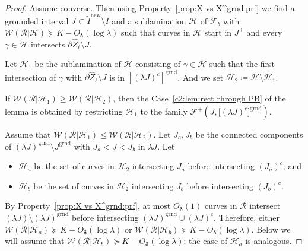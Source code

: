 \documentclass{amsart}
\newcommand{\1}{{\mathbb 1 }}
\newcommand{\FamH}{{\mathcal H}}
\newcommand{\Fam}{{\mathcal F}}
\newcommand{\Width}{{\mathcal W}}
\newcommand\RR{\mathcal{R}}
\newcommand{\wZ}{{\widehat Z}}
\newcommand{\grnd}{{\operatorname{grnd}}}
\newcommand\new{{\operatorname{new}}}
\theoremstyle{remark}
\numberwithin{equation}{section}
\theoremstyle{definition}
\newcommand{\bdelta}{{\boldsymbol{ \delta}}}
\begin{document}
\begin{proof}
Assume converse. Then using Property~\ref{prop:X vs X^grnd:prf} we find a grounded interval $J\subset \widetilde I^\new\setminus I$  and a sublamination $\FamH$ of $\Fam_b$ with $\Width(\RR|\FamH)\succeq K-O_\bdelta(\log \lambda)$ such that curves in $\FamH$ start in $J^+$ and every $\gamma\in \FamH$ intersects $\partial \wZ_\ell\setminus J$. 

Let $\FamH_1$ be the sublamination of $\FamH$ consisting of $\gamma\in \FamH$ such that the first intersection of $\gamma$ with $\partial \wZ_\ell\setminus J$ is in $\left[(\lambda J)^c\right]^\grnd$. And we set $\FamH_2\coloneqq \FamH\setminus \FamH_1$.

If $\Width(\RR|\FamH_1)\ge \Width(\RR|\FamH_2)$, then the Case~\ref{c2:lem:rect rhrough PB} of the lemma is obtained by restricting $\FamH_1$ to the family $\Fam^+\left(J, \big[(\lambda J)^c \big]^\grnd\right)$.


Assume that $\Width(\RR|\FamH_1)\le \Width(\RR|\FamH_2)$. Let $J_a,J_b$ be the connected components of $(\lambda J)^\grnd\setminus J^\grnd$ with $J_a<J<J_b$ in $\lambda J$. Let 
\begin{itemize}
\item $\FamH_a$ be the set of curves in $\FamH_2$ intersecting $J_a$ before intersecting $(J_a)^c$; and 
\item $\FamH_b$ be the set of curves in $\FamH_2$ intersecting $J_b$ before intersecting $(J_b)^c$.
\end{itemize} By Property~\ref{prop:X vs X^grnd:prf}, at most $O_\bdelta(1)$ curves in $\RR$ intersect $(\lambda J)\setminus (\lambda J)^\grnd$ before intersecting $(\lambda J)^\grnd\cup (\lambda J)^c$. Therefore, either $\Width(\RR|\FamH_a)\succeq K -O_\bdelta(\log \lambda)$ or  $\Width(\RR|\FamH_b)\succeq K -O_\bdelta(\log \lambda)$. Below we will assume that $\Width(\RR|\FamH_b)\succeq K -O_\bdelta(\log \lambda)$; the case of $\FamH_a$ is analogous.


\end{proof}
\end{document}

